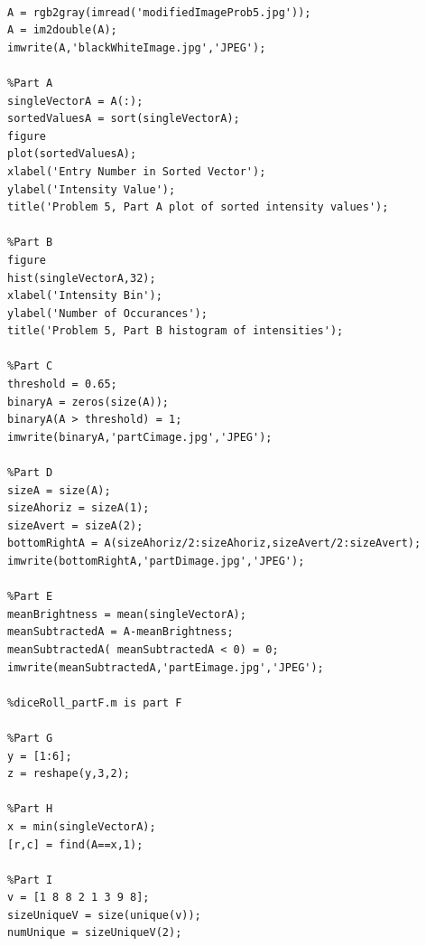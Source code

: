 \documentclass[11pt,psfig]{article}
\begin{document}
\begin{verbatim}

A = rgb2gray(imread('modifiedImageProb5.jpg'));
A = im2double(A);
imwrite(A,'blackWhiteImage.jpg','JPEG');

%Part A
singleVectorA = A(:);
sortedValuesA = sort(singleVectorA);
figure
plot(sortedValuesA);
xlabel('Entry Number in Sorted Vector');
ylabel('Intensity Value');
title('Problem 5, Part A plot of sorted intensity values');

%Part B
figure
hist(singleVectorA,32);
xlabel('Intensity Bin');
ylabel('Number of Occurances');
title('Problem 5, Part B histogram of intensities');

%Part C
threshold = 0.65;
binaryA = zeros(size(A));
binaryA(A > threshold) = 1;
imwrite(binaryA,'partCimage.jpg','JPEG');

%Part D
sizeA = size(A);
sizeAhoriz = sizeA(1);
sizeAvert = sizeA(2);
bottomRightA = A(sizeAhoriz/2:sizeAhoriz,sizeAvert/2:sizeAvert);
imwrite(bottomRightA,'partDimage.jpg','JPEG');

%Part E
meanBrightness = mean(singleVectorA);
meanSubtractedA = A-meanBrightness;
meanSubtractedA( meanSubtractedA < 0) = 0;
imwrite(meanSubtractedA,'partEimage.jpg','JPEG');

%diceRoll_partF.m is part F

%Part G
y = [1:6];
z = reshape(y,3,2);

%Part H
x = min(singleVectorA);
[r,c] = find(A==x,1);

%Part I
v = [1 8 8 2 1 3 9 8];
sizeUniqueV = size(unique(v));
numUnique = sizeUniqueV(2);

\end{verbatim}
\end{document}
